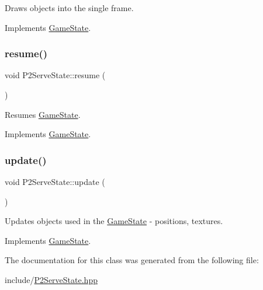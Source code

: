Draws objects into the single frame. 



Implements \mbox{\hyperlink{class_game_state_a0d56cd5355f59a87cf95e1c6d719f329}{Game\+State}}.

\mbox{\label{class_p2_serve_state_a46b9a456d44c6f22bf5bbdb62e71e490}} 
\subsubsection{\texorpdfstring{resume()}{resume()}}
{\footnotesize\ttfamily void P2\+Serve\+State\+::resume (\begin{DoxyParamCaption}{ }\end{DoxyParamCaption})\hspace{0.3cm}{\ttfamily [virtual]}}



Resumes \mbox{\hyperlink{class_game_state}{Game\+State}}. 



Implements \mbox{\hyperlink{class_game_state_a4a421c44f4dae6e9a4fbe10b6e8c47ac}{Game\+State}}.

\mbox{\label{class_p2_serve_state_a1f0ddd25c72c4e9033418a32f5389e22}} 
\subsubsection{\texorpdfstring{update()}{update()}}
{\footnotesize\ttfamily void P2\+Serve\+State\+::update (\begin{DoxyParamCaption}\item[{\mbox{\hyperlink{class_game_engine}{Game\+Engine}} $\ast$}]{ }\end{DoxyParamCaption})\hspace{0.3cm}{\ttfamily [virtual]}}



Updates objects used in the \mbox{\hyperlink{class_game_state}{Game\+State}} -\/ positions, textures. 



Implements \mbox{\hyperlink{class_game_state_a66b11afe355a9479f94aaf76576980bd}{Game\+State}}.



The documentation for this class was generated from the following file\+:\begin{DoxyCompactItemize}
\item 
include/\mbox{\hyperlink{_p2_serve_state_8hpp}{P2\+Serve\+State.\+hpp}}\end{DoxyCompactItemize}
